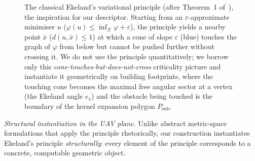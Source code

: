 \documentclass[10pt]{article}
\theoremstyle{plain}
\theoremstyle{definition}
\begin{document}
\begin{figure}[htbp]
{%
  }
  \caption{The classical Ekeland's variational principle
    (after Theorem~1 of~\cite{ekeland1974}), the inspiration for our descriptor.
    Starting from an $\varepsilon$-approximate minimiser $u$
    ($\varphi(u)\le\inf_{\mathcal{X}} \varphi+\varepsilon$), the principle yields
    a nearby point $\bar{x}$
    ($d(u,\bar{x})\le 1$) at which a cone of slope $\varepsilon$ (blue) touches the
    graph of $\varphi$ from below but cannot be pushed further without crossing it.
    We do not use the principle quantitatively; we borrow only this
    \emph{cone-touches-but-does-not-cross} criticality picture and instantiate
    it geometrically on building footprints, where the touching cone becomes
    the maximal free angular sector at a vertex (the Ekeland angle $e_v$) and
    the obstacle being touched is the boundary of the kernel expansion polygon
    $P_{\mathrm{sub}}$.}
  \label{fig:ekeland_principle}
\end{figure}

\smallskip
\noindent\textit{Structural instantiation in the UAV plane.}
Unlike abstract metric-space formulations that apply the principle
rhetorically, our construction instantiates Ekeland's principle
\emph{structurally}: every element of the principle corresponds to a concrete,
computable geometric object.
\end{document}
